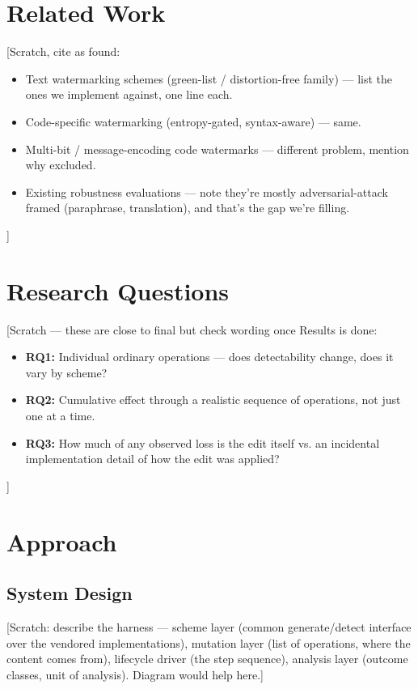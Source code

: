 \documentclass[acmsmall,screen,review,anonymous]{acmart}
\begin{document}
\section{Related Work}

[Scratch, cite as found:
\begin{itemize}
    \item Text watermarking schemes (green-list / distortion-free family) --- list the ones we
      implement against, one line each.
    \item Code-specific watermarking (entropy-gated, syntax-aware) --- same.
    \item Multi-bit / message-encoding code watermarks --- different problem, mention why excluded.
    \item Existing robustness evaluations --- note they're mostly adversarial-attack framed
      (paraphrase, translation), and that's the gap we're filling.
\end{itemize}
]


\section{Research Questions}

[Scratch --- these are close to final but check wording once Results is done:
\begin{itemize}
    \item \textbf{RQ1:} Individual ordinary operations --- does detectability change, does it vary by scheme?
    \item \textbf{RQ2:} Cumulative effect through a realistic sequence of operations, not just one at a time.
    \item \textbf{RQ3:} How much of any observed loss is the edit itself vs. an incidental
      implementation detail of how the edit was applied?
\end{itemize}
]


\section{Approach}

\subsection{System Design}
[Scratch: describe the harness --- scheme layer (common generate/detect interface over the
vendored implementations), mutation layer (list of operations, where the content comes from),
lifecycle driver (the step sequence), analysis layer (outcome classes, unit of analysis). Diagram
would help here.]
\end{document}
